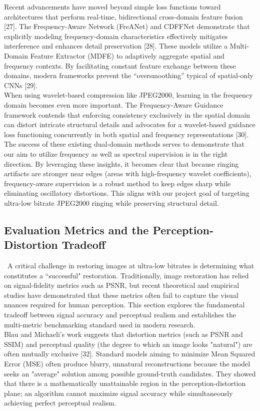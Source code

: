 \documentclass[12pt]{article}
\begin{document}
Recent advancements have moved beyond simple loss functions toward architectures that perform real-time, bidirectional cross-domain feature fusion [27]. The Frequency-Aware Network (FreANet) and CDFFNet demonstrate that explicitly modeling frequency-domain characteristics effectively mitigates interference and enhances detail preservation [28]. These models utilize a Multi-Domain Feature Extractor (MDFE) to adaptively aggregate spatial and frequency contexts. By facilitating constant feature exchange between these domains, modern frameworks prevent the ``oversmoothing'' typical of spatial-only CNNs [29]. \\


When using wavelet-based compression like JPEG2000, learning in the frequency domain becomes even more important. The Frequency-Aware Guidance framework contends that enforcing consistency exclusively in the spatial domain can distort intricate structural details and advocates for a wavelet-based guidance loss functioning concurrently in both spatial and frequency representations [30]. The success of these existing dual-domain methods serves to demonstrate that our aim to utilize frequency as well as spectral supervision is in the right direction. By leveraging these insights, it becomes clear that because ringing artifacts are stronger near edges (areas with high-frequency wavelet coefficients), frequency-aware supervision is a robust method to keep edges sharp while eliminating oscillatory distortions. This aligns with our project goal of targeting ultra-low bitrate JPEG2000 ringing while preserving structural detail.

\subsection*{Evaluation Metrics and the Perception-Distortion Tradeoff}

\quad \, A critical challenge in restoring images at ultra-low bitrates is determining what constitutes a ``successful" restoration. Traditionally, image restoration has relied on signal-fidelity metrics such as PSNR, but recent theoretical and empirical studies have demonstrated that these metrics often fail to capture the visual nuances required for human perception. This section explores the fundamental tradeoff between signal accuracy and perceptual realism and establishes the multi-metric benchmarking standard used in modern research. \\

Blau and Michaeli's work suggests that distortion metrics (such as PSNR and SSIM) and perceptual quality (the degree to which an image looks "natural") are often mutually exclusive [32]. Standard models aiming to minimize Mean Squared Error (MSE) often produce blurry, unnatural reconstructions because the model seeks an "average" solution among possible ground-truth candidates. They showed that there is a mathematically unattainable region in the perception-distortion plane; an algorithm cannot maximize signal accuracy while simultaneously achieving perfect perceptual realism. \\
\end{document}
